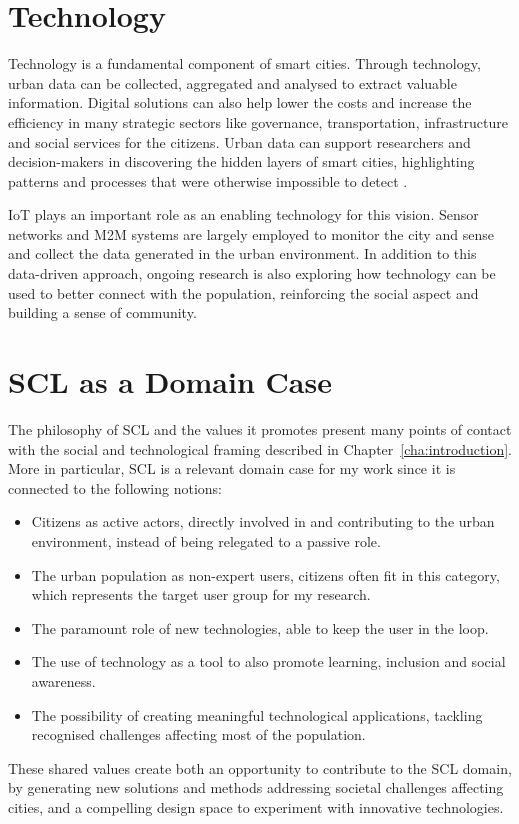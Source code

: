 \section{Technology}

Technology is a fundamental component of smart cities. Through technology, urban data can be collected, aggregated and analysed to extract valuable information. Digital solutions can also help lower the costs and increase the efficiency in many strategic sectors like governance, transportation, infrastructure and social services for the citizens. Urban data can support researchers and decision-makers in discovering the hidden layers of smart cities, highlighting patterns and processes that were otherwise impossible to detect \autocite{vazifeh_addressing_2018}.

IoT plays an important role as an enabling technology for this vision. Sensor networks and M2M systems are largely employed to monitor the city and sense and collect the data generated in the urban environment. In addition to this data-driven approach, ongoing research is also exploring how technology can be used to better connect with the population, reinforcing the social aspect and building a sense of community.


\section{SCL as a Domain Case}

The philosophy of SCL and the values it promotes present many points of contact with the social and technological framing described in Chapter~\ref{cha:introduction}. More in particular, SCL is a relevant domain case for my work since it is connected to the following notions:

\begin{itemize}
	\item Citizens as active actors, directly involved in and contributing to the urban environment, instead of being relegated to a passive role.
	\item The urban population as non-expert users, citizens often fit in this category, which represents the target user group for my research.
	\item The paramount role of new technologies, able to keep the user in the loop.
	\item The use of technology as a tool to also promote learning, inclusion and social awareness.
	\item The possibility of creating meaningful technological applications, tackling recognised challenges affecting most of the population.
\end{itemize}

These shared values create both an opportunity to contribute to the SCL domain, by generating new solutions and methods addressing societal challenges affecting cities, and a compelling design space to experiment with innovative technologies.
